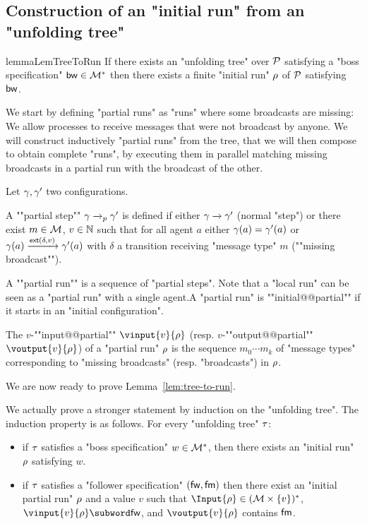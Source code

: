 \subsection{Construction of an "initial run" from an "unfolding tree"}
\label{app:tree-to-run}

\begin{restatable}{lemma}{LemTreeToRun}
	\label{lem:tree-to-run}
	If there exists an "unfolding tree" over $\mathcal{P}$ satisfying a "boss specification" $\mathsf{bw} \in \mathcal{M}^*$ then there exists a finite "initial run" $\rho$ of $\mathcal{P}$ satisfying $\mathsf{bw}$.
\end{restatable}

We start by defining "partial runs" as "runs" where some broadcasts are missing: We allow processes to receive messages that were not broadcast by anyone. We will construct inductively "partial runs" from the tree, that we will then compose to obtain complete "runs", by executing them in parallel matching missing broadcasts in a partial run with the broadcast of the other.

\begin{definition}
	Let $\gamma, \gamma'$ two configurations. 
	
	A ""partial step"" $\gamma \xrightarrow{}_{p} \gamma'$ is defined if either $\gamma \xrightarrow{} \gamma'$ (normal "step") or there exist $m \in \mathcal{M}$, $v\in \mathbb{N}$ such that for all agent $a$ either $\gamma(a) = \gamma'(a)$ or $\gamma(a) \xrightarrow{\mathsf{ext}(\delta,v)} \gamma'(a)$ with $\delta$ a transition receiving "message type" $m$ (""missing broadcast"").
	
	A ""partial run"" is a sequence of "partial steps".
	Note that a "local run" can be seen as a "partial run" with a single agent.A "partial run" is ""initial@@partial"" if it starts in an "initial configuration".
	
	
	\AP The $v$-""input@@partial"" $\vinput{v}{\run}$ (resp. $v$-""output@@partial"" $\voutput{v}{\run}$) of a "partial run" $\rho$ is the sequence $m_0 \cdots m_k$ of "message types" corresponding to "missing broadcasts" (resp. "broadcasts") in $\rho$.
\end{definition}


We are now ready to prove Lemma~\ref{lem:tree-to-run}.

\LemTreeToRun*

We actually prove a stronger statement by induction on the "unfolding tree".
The induction property is as follows. For every "unfolding tree" $\tau$:
\begin{itemize}
	\item if $\tau$ satisfies a "boss specification" $w \in \mathcal{M}^*$, then there exists an "initial run" $\rho$ satisfying $w$.
	\item if $\tau$ satisfies a "follower specification" $(\mathsf{fw}, \mathsf{fm})$ then there exist an "initial partial run" $\rho$ and a value $v$ such that $\Input{\run} \in (\messages\times \set{v})^*$, $\vinput{v}{\run} \subword \followwordspec$, and $\voutput{v}{\run}$ contains $\mathsf{fm}$.
\end{itemize}

